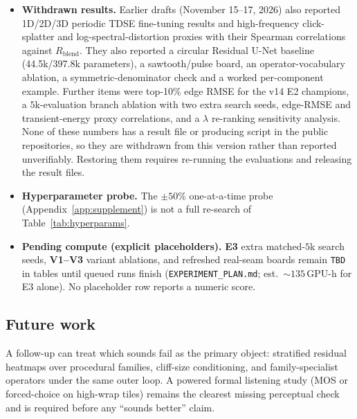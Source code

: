 \begin{itemize}
  \item \textbf{Withdrawn results.}
    Earlier drafts (November 15--17, 2026) also reported 1D/2D/3D periodic TDSE fine-tuning results and high-frequency click-splatter and log-spectral-distortion proxies with their Spearman correlations against $R_{\mathrm{blend}}$. They also reported a circular Residual U-Net baseline (44.5k/397.8k parameters), a sawtooth/pulse board, an operator-vocabulary ablation, a symmetric-denominator check and a worked per-component example. Further items were top-10\% edge RMSE for the v14 E2 champions, a $5$k-evaluation branch ablation with two extra search seeds, edge-RMSE and transient-energy proxy correlations, and a $\lambda$ re-ranking sensitivity analysis.
    None of these numbers has a result file or producing script in the public repositories, so they are withdrawn from this version rather than reported unverifiably. Restoring them requires re-running the evaluations and releasing the result files.
  \item \textbf{Hyperparameter probe.}
    The $\pm 50\%$ one-at-a-time probe (Appendix~\ref{app:supplement}) is not a full re-search of Table~\ref{tab:hyperparams}.
  \item \textbf{Pending compute (explicit placeholders).}
    \textbf{E3} extra matched-$5$k search seeds, \textbf{V1--V3} variant ablations, and refreshed real-seam boards remain \texttt{TBD} in tables until queued runs finish (\texttt{EXPERIMENT\_PLAN.md}; est.\ ${\sim}135$\,GPU-h for E3 alone).
    No placeholder row reports a numeric score.
\end{itemize}

\subsection{Future work}
\label{sec:outlook}

A follow-up can treat which sounds fail as the primary object: stratified residual heatmaps over procedural families, cliff-size conditioning, and family-specialist operators under the same outer loop.
A powered formal listening study (MOS or forced-choice on high-wrap tiles) remains the clearest missing perceptual check and is required before any ``sounds better'' claim.
